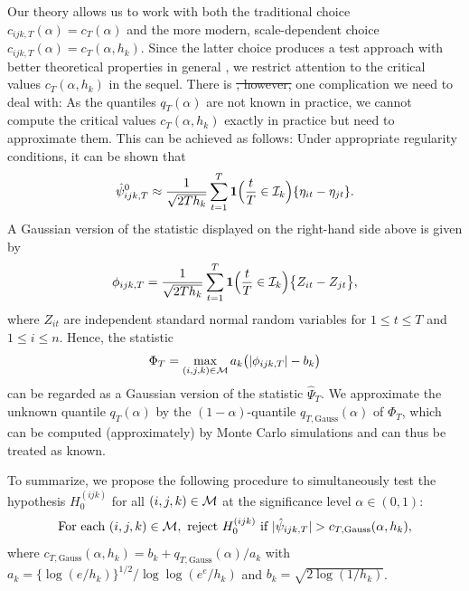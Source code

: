 \documentclass[a4paper,12pt]{article}
\numberwithin{equation}{section}
\begin{document}
Our theory allows us to work with both the traditional choice $c_{ijk,T}(\alpha) = c_T(\alpha)$ and the more modern, scale-dependent choice $c_{ijk,T}(\alpha) = c_T(\alpha,h_k)$. Since the latter choice produces a test approach with better theoretical properties in general {\color{red}\citep[see][]{DuembgenSpokoiny2001}}, we restrict attention to the critical values $c_T(\alpha,h_k)$ in the sequel. There is {\color{red}\sout{, however,}} one complication we need to deal with: As the quantiles $q_T(\alpha)$ are not known in practice, we cannot compute the critical values $c_T(\alpha,h_k)$ exactly in practice but need to approximate them. This can be achieved as follows: Under appropriate regularity conditions, it can be shown that {\color{red} 
\begin{align*}
\hat{\psi}_{ijk,T}^0 
  \approx \frac{1}{\sqrt{2Th_k}} \sum\limits_{t=1}^T \boldsymbol{1}\Big(\frac{t}{T} \in \mathcal{I}_k\Big) \{ \eta_{it} - \eta_{jt} \}.
\end{align*} 
A Gaussian version of the statistic displayed on the right-hand side above} is given by 
\begin{equation*}
\phi_{ijk,T} = \frac{1}{\sqrt{2Th_k}} \sum\limits_{t=1}^T \boldsymbol{1}\Big(\frac{t}{T} \in \mathcal{I}_k\Big) \big\{ Z_{it} - Z_{jt} \big\},
\end{equation*}
where $Z_{it}$ are independent standard normal random variables for $1 \le t \le T$ and $1 \le i \le n$. Hence, the statistic 
\[ \Phi_T = \max_{(i,j,k) \in \mathcal{M}} a_k \big( |\phi_{ijk,T}| - b_k \big) \]
can be regarded as a Gaussian version of the statistic $\hat{\Psi}_T$. We approximate the unknown quantile $q_T(\alpha)$ by the $(1-\alpha)$-quantile $q_{T,\text{Gauss}}(\alpha)$ of $\Phi_T$, which can be computed (approximately) by Monte Carlo simulations and can thus be treated as known. 


To summarize, we propose the following procedure to simultaneously test the hypothesis $H_0^{(ijk)}$ for all $(i,j,k) \in \mathcal{M}$ at the significance level $\alpha \in (0,1)$: 
\begin{equation}\label{eq:test}
\text{For each } (i,j,k) \in \mathcal{M}, \text{ reject } H_0^{(ijk)} \text{ if } |\hat{\psi}_{ijk,T}| > c_{T,\text{Gauss}}(\alpha,h_k),
\end{equation}
where $c_{T,\text{Gauss}}(\alpha,h_k) = b_k + q_{T,\text{Gauss}}(\alpha)/a_k$ with $a_k = \{\log(e/h_k)\}^{1/2} / \log \log(e^e / h_k)$ and $b_k = \sqrt{2 \log(1/h_k)}$. 
\end{document}
